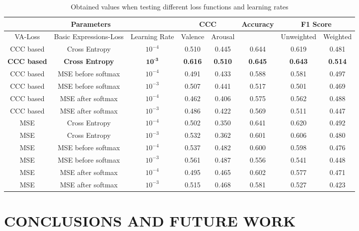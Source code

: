 \documentclass[a4paper, 10pt, conference]{ieeeconf}      %
\begin{document}
\begin{table*}[h]
\caption{Obtained values when testing different loss functions and learning rates}
\label{all}
\centering
\begin{tabular}{ |c|c|c|c|c|c|c|c| }
 \hline
 \multicolumn{3}{|c|}{Parameters} & \multicolumn{2}{c|}{CCC} & \multicolumn{1}{c|}{Accuracy} & \multicolumn{2}{c|}{F1 Score}  \\
 \hline
 VA-Loss & Basic Expressions-Loss & Learning Rate  & Valence & Arousal & & Unweighted & Weighted    \\
\hhline{|=|=|=|=|=|=|=|=|}
CCC based & Cross Entropy & $10^{-4}$ &0.510 &0.445 & 0.644  & 0.619  & 0.481   \\
 \hline
\textbf{CCC based} & \textbf{Cross Entropy} & $\textbf{10}^{\textbf{-3}}$ &\textbf{0.616} &\textbf{0.510} & \textbf{0.645}  & \textbf{0.643}  & \textbf{0.514}  \\
\hline
CCC based & MSE before softmax & $10^{-4}$ &0.491 &0.433 & 0.588  & 0.581  & 0.497  \\
 \hline
CCC based & MSE before softmax & $10^{-3}$ &0.507 &0.441 & 0.517 & 0.501  & 0.469  \\
\hline
CCC based & MSE after softmax & $10^{-4}$ &0.462 &0.406 & 0.575 & 0.562  & 0.488  \\
 \hline
CCC based & MSE after softmax & $10^{-3}$ &0.486 &0.422 & 0.569  & 0.511  & 0.447 \\
\hline
MSE & Cross Entropy & $10^{-4}$ &0.502 &0.350 & 0.641  & 0.620  & 0.492   \\
\hline
MSE & Cross Entropy & $10^{-3}$ &0.532 &0.362 & 0.601  & 0.606  & 0.480   \\
\hline
MSE & MSE before softmax & $10^{-4}$ &0.537 &0.482 & 0.600  & 0.598  & 0.476   \\
\hline
MSE & MSE before softmax & $10^{-3}$ &0.561 &0.487 & 0.556  & 0.541  & 0.448   \\
\hline
MSE & MSE after softmax & $10^{-4}$ &0.495 &0.465 & 0.602  & 0.577  & 0.471   \\
\hline
MSE & MSE after softmax & $10^{-3}$ &0.515 &0.468 & 0.581  & 0.527  & 0.423   \\
\hline
\end{tabular}
\end{table*}

\section{CONCLUSIONS AND FUTURE WORK}
\end{document}
